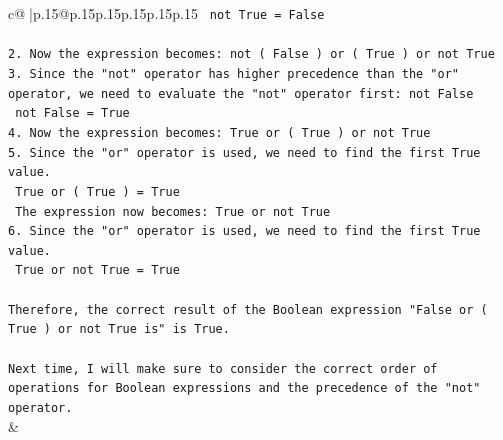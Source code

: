 \documentclass{article}
\begin{document}
{\begin{supertabular}{c@{$\;$}|p{.15\linewidth}@{}p{.15\linewidth}p{.15\linewidth}p{.15\linewidth}p{.15\linewidth}p{.15\linewidth}}
{{{\texttt{   not True = False} \\
\\ 
\texttt{2. Now the expression becomes: not ( False ) or ( True ) or not True} \\
\texttt{3. Since the "not" operator has higher precedence than the "or" operator, we need to evaluate the "not" operator first: not False} \\
\texttt{   not False = True} \\
\texttt{4. Now the expression becomes: True or ( True ) or not True} \\
\texttt{5. Since the "or" operator is used, we need to find the first True value. } \\
\texttt{   True or ( True ) = True} \\
\texttt{   The expression now becomes: True or not True} \\
\texttt{6. Since the "or" operator is used, we need to find the first True value. } \\
\texttt{   True or not True = True} \\
\\ 
\texttt{Therefore, the correct result of the Boolean expression "False or ( True ) or not True is" is True. } \\
\\ 
\texttt{Next time, I will make sure to consider the correct order of operations for Boolean expressions and the precedence of the "not" operator.} \\
            }
        }
    }
    & \\ \\

\end{supertabular}
}
\end{document}
